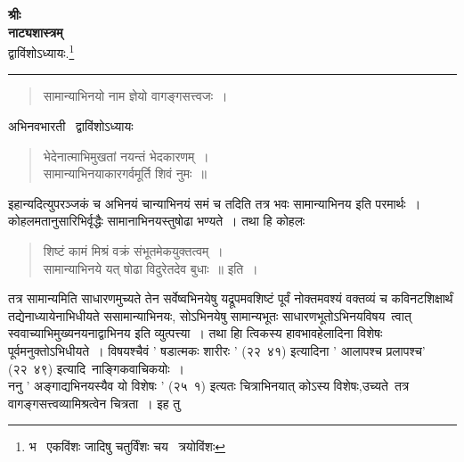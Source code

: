 \documentclass[11pt, openany]{book}
\begin{document}
\begin{center}
\textbf{\large श्रीः }\\

\vspace{2mm}
\textbf{\huge नाट्यशास्त्रम् }\\
\vspace{2mm}
द्वाविंशोऽध्यायः.\renewcommand{\thefootnote}{1}\footnote{भ \textendash\ एकविंशः जादिषु चतुर्विंशः चय \textendash\ त्रयोविंशः}\\
\rule{0.2\linewidth}{0.5pt}
\end{center}

\begin{quote}
{\na सामान्याभिनयो नाम ज्ञेयो वागङ्गसत्त्वजः~। }
\end{quote}

\begin{center}
अभिनवभारती \textendash\ द्वाविंशोऽध्यायः
\end{center}

\begin{quote}
{\qt भेदेनात्माभिमुखतां नयन्तं भेदकारणम्~। \\
सामान्याभिनयाकारगर्वमूर्ति शिवं नुमः~॥ }
 \end{quote}

इहान्यदित्युपरञ्जकं च अभिनयं चान्याभिनयं समं च तदिति तत्र भवः सामान्याभिनय इति परमार्थः~। कोहलमतानुसारिभिर्वृद्धैः सामानाभिनयस्तुषोढा भण्यते~। तथा हि कोहलः\textendash\ 

\begin{quote}
{\qt शिष्टं कामं मिश्रं वक्रं संभूतमेकयुक्तत्वम्~। \\
सामान्याभिनये यत् षोढा विदुरेतदेव बुधाः~॥ इति~। }
\end{quote}

तत्र सामान्यमिति साधारणमुच्यते तेन सर्वेष्वभिनयेषु यद्रूपमवशिष्टं पूर्वं नोक्तमवश्यं वक्तव्यं च कविनटशिक्षार्थं तद्येनाध्यायेनाभिधीयते ससामान्याभिनयः, सोऽभिनयेषु सामान्यभूतः साधारणभूतोऽभिनयविषय\textendash\ त्वात् स्ववाच्याभिमुख्यनयनाद्वाभिनय इति व्युत्पत्त्या~। तथा हिा त्विकस्य हावभावहेलादिना विशेषः पूर्वमनुक्तोऽभिधीयते~। विषयश्चैवं ' षडात्मकः शारीरः ' (२२\textendash\ ४१) इत्यादिना ' आलापश्च प्रलापश्च' (२२\textendash\ ४९) इत्यादि\textendash\ नाङ्गिकवाचिकयोः~।\\

ननु ' अङ्गाद्यभिनयस्यैव यो विशेषः ' (२५\textendash\ १) इत्यतः चित्राभिनयात् कोऽस्य विशेषः,उच्यते\textendash\ तत्र वागङ्गसत्त्वव्यामिश्रत्वेन चित्रता~। इह तु

\newpage
{}
\end{document}
